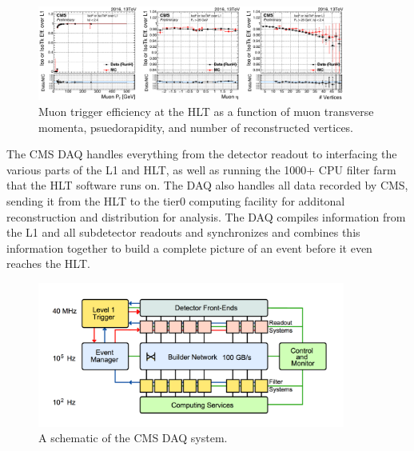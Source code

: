 \begin{figure}[hbtp]
 \begin{center}
   \includegraphics[width=0.9\textwidth]{ch3_figs/hlt_eff_muons.pdf}
   \caption[Trigger efficiency at the HLT]{Muon trigger efficiency at the HLT as a function of muon transverse momenta, psuedorapidity, and number of reconstructed vertices.}
   \label{fig:hlt_eff_muons}
 \end{center}
\end{figure}

The CMS DAQ handles everything from the detector readout to interfacing the various parts of the L1 and HLT, as well as running the 1000+ CPU filter farm that the HLT software runs on. The DAQ also handles all data recorded by CMS, sending it from the HLT
to the tier0 computing facility for additonal reconstruction and distribution for analysis. The DAQ compiles information from the L1 and all subdetector readouts and synchronizes and combines this information together to build a complete picture of an
event before it even reaches the HLT.    

\begin{figure}[hbtp]
 \begin{center}
   \includegraphics[width=0.9\textwidth]{ch3_figs/cms_daq.pdf}
   \caption[The CMS DAQ system]{A schematic of the CMS DAQ system.}
   \label{fig:cms_daq}
 \end{center}
\end{figure}

%
% 
% 
